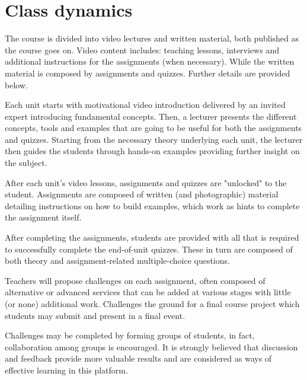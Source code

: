 \documentclass{tufte-book} %
\begin{document}
\section{Class dynamics}

The course is divided into video lectures and written material, both published as the course goes on. Video content includes: teaching lessons, interviews and additional instructions for the assignments (when necessary). While the written material is composed by assignments and quizzes. Further details are provided below.

Each unit starts with motivational video introduction delivered by an invited expert introducing fundamental concepts.
Then, a lecturer presents the different concepts, tools and examples that are going to be useful for both the assignments and quizzes.
Starting from the necessary theory underlying each unit, the lecturer then guides the students through hands-on examples providing further insight on the subject.

After each unit's video lessons, assignments and quizzes are "unlocked" to the student. Assignments are composed of written (and photographic) material detailing instructions on how to build examples, which work as hints to complete the assignment itself.

After completing the assignments, students are provided with all that is required to successfully complete the end-of-unit quizzes. These in turn are composed of both theory and assignment-related multiple-choice questions.

Teachers will propose challenges on each assignment, often composed of alternative or advanced services that can be added at various stages with little (or none) additional work. Challenges the ground for a final course project which students may submit and present in a final event.

Challenges may be completed by forming groups of students, in fact, collaboration among groups is encouraged. It is strongly believed that discussion and feedback provide more valuable results and are considered as ways of effective learning in this platform.

\end{document}
